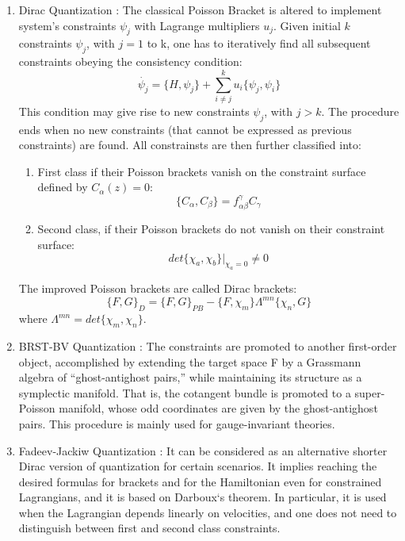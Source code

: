 \documentclass[a4paper,10pt]{article}
\numberwithin{equation}{section}
\begin{document}
\begin{enumerate}

\item 
Dirac Quantization \cite{DiracQMLectures}: The classical Poisson Bracket is altered to implement system's constraints $\psi_j$ with Lagrange multipliers $u_j$. Given initial $k$ constraints $\psi_j$, with $j = 1$ to k, one has to iteratively find all subsequent constraints obeying the consistency condition:
\begin{equation}
    \dot{\psi_j} = \{H, \psi_j \} + \sum_{i\neq j}^k u_i \{\psi_j, \psi_i \} 
\end{equation}
This condition may give rise to new constraints $\psi_j$, with $j>k$. The procedure ends when no new constraints (that cannot be expressed as previous constraints) are found. All constrainsts are then further classified into:
\begin{enumerate}
\item First class if their Poisson brackets vanish on the constraint surface defined by $C_\alpha (z) = 0$:
\begin{equation}
\{ C_\alpha, C_\beta \} = f_{\alpha \beta}^\gamma C_\gamma
\end{equation}

\item Second class, if their Poisson brackets do not vanish on their constraint surface:
\begin{equation}
det\{\chi_a, \chi_b\}|_{\chi_a = 0} \neq 0
\end{equation}
\end{enumerate}
The improved Poisson brackets are called Dirac brackets:
\begin{equation}
    \{F, G\}_{D} = \{F, G \}_{PB} - \{F, \chi_m\} \Lambda^{mn}\{\chi_n, G\}
\end{equation}
where $\Lambda^{mn} = det\{\chi_m, \chi_n\}$.



\item 
BRST-BV Quantization \cite{BRSTprimer, BVformalism}: The constraints are promoted to another first-order object, accomplished by extending the target space F by a Grassmann algebra of “ghost-antighost pairs,” while maintaining its structure as a symplectic manifold. That is, the cotangent bundle is promoted to a super-Poisson manifold, whose odd coordinates are given by the ghost-antighost pairs. This procedure is mainly used for gauge-invariant theories.


\item 
Fadeev-Jackiw Quantization \cite{withouttears}: It can be considered as an alternative shorter Dirac version of quantization for certain scenarios. It implies reaching the desired formulas for brackets and for the Hamiltonian even for constrained Lagrangians, and it is based on Darboux`s theorem. In particular, it is used when the Lagrangian depends linearly on velocities, and one does not need to distinguish between first and second class constraints.

\end{enumerate}
\end{document}
